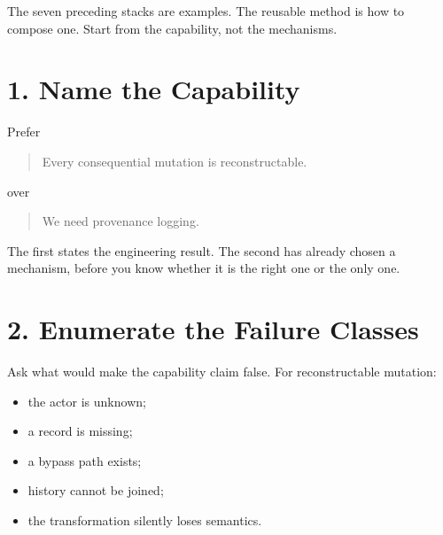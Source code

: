 
The seven preceding stacks are examples. The reusable method is how to compose one. Start from the capability, not the mechanisms.

\section{1. Name the Capability}\label{heading:name-the-capability}

Prefer


\begin{quote}
Every consequential mutation is reconstructable.
\end{quote}

over


\begin{quote}
We need provenance logging.
\end{quote}

The first states the engineering result. The second has already chosen a mechanism, before you know whether it is the right one or the only one.

\section{2. Enumerate the Failure Classes}\label{heading:enumerate-the-failure-classes}

Ask what would make the capability claim false. For reconstructable mutation:

\begin{itemize}
\tightlist
\item
  the actor is unknown;
\item
  a record is missing;
\item
  a bypass path exists;
\item
  history cannot be joined;
\item
  the transformation silently loses semantics.
\end{itemize}

